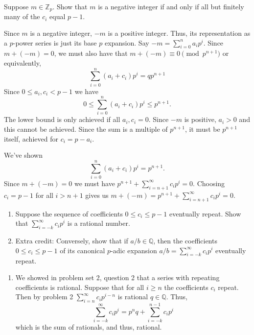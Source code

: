 \documentclass[12 pt, letterpaper]{hmcpset}
\begin{document}
\begin{problem}[(1)]
	Suppose $m \in \mathbb{Z}_{p}$. Show that $m$ is a negative integer if and only if all but finitely many of the $c_{i}$ equal $p - 1$.
\end{problem}

\begin{solution}
	Since $m$ is a negative integer, $-m$ is a positive integer. Thus, its representation as a $p$-power series is just its base $p$ expansion. Say $-m = \sum_{i = 0}^{n} a_{i} p^{i}$. Since $m + (-m) = 0$, we must also have that $m + (-m) \equiv 0 \pmod{p^{n + 1}}$ or equivalently,
	\[
		\sum_{i = 0}^{n} (a_{i} + c_{i}) p^{i} = q p^{n + 1}
	\]
	Since $0 \le a_{i}, c_{i} < p - 1$ we have
	\[
		0 \le \sum_{i = 0}^{n} (a_{i} + c_{i}) p^{i} \le p^{n + 1}.
	\]
	The lower bound is only achieved if all $a_{i}, c_{i} = 0$. Since $-m$ is positive, $a_{i} > 0$ and this cannot be achieved. Since the sum is a multiple of $p^{n + 1}$, it must be $p^{n + 1}$ itself, achieved for $c_{i} = p - a_{i}$.

	We've shown
	 \[
		\sum_{i = 0}^{n} (a_{i} + c_{i}) p^{i} = p^{n + 1}.
	\]
	Since $m + (-m) = 0$ we must have $p^{n + 1} + \sum_{i = n + 1}^{\infty} c_{i} p^{i} = 0$. Choosing $c_{i} = p - 1$ for all $i > n + 1$ gives us $m + (-m) = p^{n + 1} + \sum_{i = n + 1}^{\infty} c_{i} p^{i} = 0$.
\end{solution}

\pagebreak

\begin{problem}[(2)]
	\begin{enumerate}
		\item Suppose the sequence of coefficients $0 \le c_{i} \le p - 1$ eventually repeat. Show that $\sum_{i = -k}^{\infty} c_{i} p^{i}$ is a rational number.

		\item Extra credit: Conversely, show that if $a / b \in \mathbb{Q}$, then the coefficients $0 \le c_{i} \le p - 1$ of its canonical $p$-adic expansion $a / b = \sum_{i = -k}^{\infty} c_{i} p^{i}$ eventually repeat.
	\end{enumerate}
\end{problem}

\begin{solution}
	\begin{enumerate}
		\item We showed in problem set 2, question 2 that a series with repeating coefficients is rational. Suppose that for all $i \ge n$ the coefficients $c_{i}$ repeat. Then by problem 2 $\sum_{i = n}^{\infty} c_{i} p^{i - n}$ is rational $q \in \mathbb{Q}$. Thus,
			\[
				\sum_{i = -k}^{\infty} c_{i} p^{i} = p^{n} q + \sum_{i = -k}^{n - 1} c_{i} p^{i}
			\]
			which is the sum of rationals, and thus, rational.
	\end{enumerate}
\end{solution}
\end{document}
